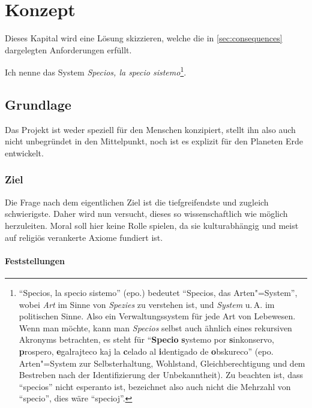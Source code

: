 \chapter{Konzept}\label{chap:concept}

Dieses Kapital wird eine Lösung skizzieren, welche die in \vref{sec:consequences} dargelegten Anforderungen erfüllt.

Ich nenne das System \textit{Specios, la specio sistemo}\footnote{"`Specios, la specio sistemo"' (epo.) bedeutet "`Specios, das Arten"=System"', wobei \textit{Art} im Sinne von \textit{Spezies} zu verstehen ist, und \textit{System} u.\,A. im politischen Sinne. Also ein Verwaltungssystem für jede Art von Lebewesen. Wenn man möchte, kann man \textit{Specios} selbst auch ähnlich eines rekursiven Akronyms betrachten, es steht für "`\textbf{Specio} \textbf{s}ystemo por \textbf{s}inkonservo, \textbf{p}rospero, \textbf{e}galrajteco kaj la \textbf{c}elado al \textbf{i}dentigado de \textbf{o}bskureco"' (epo. Arten"=System zur Selbsterhaltung, Wohlstand, Gleichberechtigung und dem Bestreben nach der Identifizierung der Unbekanntheit). Zu beachten ist, dass "`specios"' nicht esperanto ist, bezeichnet also auch nicht die Mehrzahl von "`specio"', dies wäre "`specioj"'.}.

\section{Grundlage}\label{sec:basis}

Das Projekt ist weder speziell für den Menschen konzipiert, stellt ihn also auch nicht unbegründet in den Mittelpunkt, noch ist es explizit für den Planeten Erde entwickelt.

\subsection{Ziel}\label{sec:basis/aim}

Die Frage nach dem eigentlichen Ziel ist die tiefgreifendste und zugleich schwierigste. Daher wird nun versucht, dieses so wissenschaftlich wie möglich herzuleiten. Moral soll hier keine Rolle spielen, da sie kulturabhängig und meist auf religiös verankerte Axiome fundiert ist.

\subsubsection{Feststellungen}

